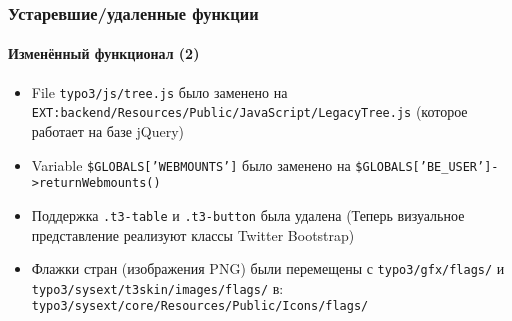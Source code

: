 \begin{frame}[fragile]
	\frametitle{Устаревшие/удаленные функции}
	\framesubtitle{Изменённый функционал (2)}

	\begin{itemize}

		\item File
			\small\texttt{typo3/js/tree.js}\normalsize\space
			было заменено на
			\small\texttt{EXT:backend/Resources/Public/JavaScript/LegacyTree.js}\normalsize\newline
			(которое работает на базе jQuery)

		\item Variable
			\small\texttt{\$GLOBALS['WEBMOUNTS']}\normalsize\space
			было заменено на
			\small\texttt{\$GLOBALS['BE\_USER']->returnWebmounts()}\normalsize

		\item Поддержка
			\small\texttt{.t3-table}\normalsize\space
			и
			\small\texttt{.t3-button}\normalsize\space
			была удалена\newline
			\small
				(Теперь визуальное представление реализуют классы Twitter Bootstrap)
			\normalsize

		\item Флажки стран (изображения PNG) были перемещены с
			\small\texttt{typo3/gfx/flags/}\normalsize
			и
			\small\texttt{typo3/sysext/t3skin/images/flags/}\normalsize\newline
			в: \small\texttt{typo3/sysext/core/Resources/Public/Icons/flags/}\normalsize

	\end{itemize}

\end{frame}


